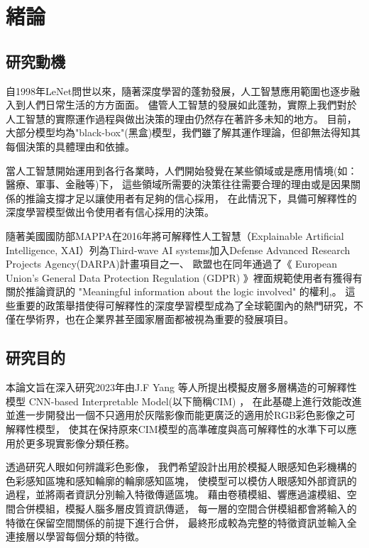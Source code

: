 \documentclass[class=NCU_thesis, crop=false]{standalone}
\begin{document}
\chapter{緒論}
\section{研究動機}

自1998年LeNet\cite{726791}問世以來，隨著深度學習的蓬勃發展，人工智慧應用範圍也逐步融入到人們日常生活的方方面面。
儘管人工智慧的發展如此蓬勃，實際上我們對於人工智慧的實際運作過程與做出決策的理由仍然存在著許多未知的地方。
目前，大部分模型均為"black-box"(黑盒)模型，我們雖了解其運作理論，但卻無法得知其每個決策的具體理由和依據。

當人工智慧開始運用到各行各業時，人們開始發覺在某些領域或是應用情境(如：醫療、軍事、金融等)下，
這些領域所需要的決策往往需要合理的理由或是因果關係的推論支撐才足以讓使用者有足夠的信心採用，
在此情況下，具備可解釋性的深度學習模型做出令使用者有信心採用的決策。

隨著美國國防部MAPPA在2016年將可解釋性人工智慧（Explainable Artificial Intelligence, XAI）列為Third-wave AI systems加入Defense Advanced Research Projects Agency(DARPA)計畫項目之一\cite{DARPA}、
歐盟也在同年通過了《 European Union's General Data Protection Regulation (GDPR) 》裡面規範使用者有獲得有關於推論資訊的 "Meaningful information about the logic involved" 的權利\cite{GDPR2016a},\cite{doi:10.1080/13600834.2019.1573501}。 這些重要的政策舉措使得可解釋性的深度學習模型成為了全球範圍內的熱門研究，不僅在學術界，也在企業界甚至國家層面都被視為重要的發展項目。

\pagebreak
\section{研究目的}
本論文旨在深入研究2023年由J.F Yang 等人所提出模擬皮層多層構造的可解釋性模型 CNN-based Interpretable Model(以下簡稱CIM) \cite{YangCNNInterpretable}，
在此基礎上進行效能改進並進一步開發出一個不只適用於灰階影像而能更廣泛的適用於RGB彩色影像之可解釋性模型，
使其在保持原來CIM模型的高準確度與高可解釋性的水準下可以應用於更多現實影像分類任務。

透過研究人眼如何辨識彩色影像，
我們希望設計出用於模擬人眼感知色彩機構的色彩感知區塊和感知輪廓的輪廓感知區塊，
使模型可以模仿人眼感知外部資訊的過程，並將兩者資訊分別輸入特徵傳遞區塊。
藉由卷積模組、響應過濾模組、空間合併模組，模擬人腦多層皮質資訊傳遞，
每一層的空間合併模組都會將輸入的特徵在保留空間關係的前提下進行合併，
最終形成較為完整的特徵資訊並輸入全連接層以學習每個分類的特徵。
\end{document}
